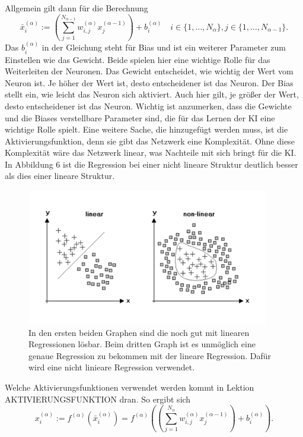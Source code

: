 \documentclass[11pt]{article}
\begin{document}
Allgemein gilt dann für die Berechnung
\begin{equation}
    \bar{x}_{i}^{(\alpha)} := (\sum_{j=1}^{N_{\alpha-1}} w_{i,j}^{(\alpha)} x_{j}^{(\alpha-1)}) + b_{i}^{(\alpha)} \quad i \in \{1,\ldots,N_{\alpha}\}, j \in \{1,\ldots,N_{\alpha-1}\}.
\end{equation}
Das $ b_{i}^{(\alpha)} $ in der Gleichung steht für Bias und ist ein weiterer Parameter zum Einstellen wie das Gewicht. Beide spielen hier eine wichtige Rolle
für das Weiterleiten der Neuronen. Das Gewicht entscheidet, wie wichtig der Wert vom Neuron ist. Je höher der Wert ist, desto entscheidener
ist das Neuron. Der Bias stellt ein, wie leicht das Neuron sich aktiviert. Auch hier gilt, je größer der Wert, desto entscheidener ist das Neuron.
Wichtig ist anzumerken, dass die Gewichte und die Biases verstellbare Parameter sind, die für das Lernen der KI eine wichtige Rolle
spielt. Eine weitere Sache, die hinzugefügt werden muss, ist die Aktivierungsfunktion, denn sie gibt das Netzwerk eine Komplexität.
Ohne diese Komplexität wäre das Netzwerk linear, was Nachteile mit sich bringt für die KI. In Abbildung 6 ist die Regression bei einer
nicht lineare Struktur deutlich besser als dies einer lineare Struktur.
\begin{figure}[h]
    \centering
    \includegraphics[width=300pt, keepaspectratio]{images/regression}
    \caption{In den ersten beiden Graphen sind die noch gut mit linearen Regressionen lösbar. Beim dritten Graph ist es
    unmöglich eine genaue Regression zu bekommen mit der lineare Regression. Dafür wird eine nicht linieare Regression verwendet.}
\end{figure}
Welche Aktivierungsfunktionen verwendet werden kommt in Lektion AKTIVIERUNGSFUNKTION dran. So ergibt sich
\begin{equation}
    x_{i}^{(\alpha)} := f^{(\alpha)}(\bar{x}_{i}^{(\alpha)}) = f^{(\alpha)}((\sum_{j=1}^{N_{\alpha}} w_{i,j}^{(\alpha)} x_{j}^{(\alpha-1)}) + b_{i}^{(\alpha)}).
\end{equation}
\end{document}
